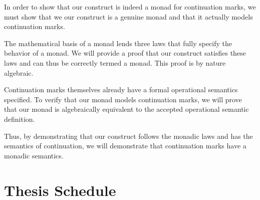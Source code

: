 \documentclass[ms]{byuprop}
\newcounter{definition}
\begin{document}

In order to show that our construct is indeed a monad for continuation marks, we must show
that we our construct is a genuine monad and that it actually models continuation marks.

The mathematical basis of a monad lends three laws that fully specify the behavior of a 
monad. We will provide a proof that our construct satisfies these laws and can thus be 
correctly termed a monad. This proof is by nature algebraic.

Continuation marks themselves already have a formal operational semantics specified. To 
verify that our monad models continuation marks, we will prove that our monad is 
algebraically equivalent to the accepted operational semantic definition.

Thus, by demonstrating that our construct follows the monadic laws and has the semantics
of continuation, we will demonstrate that continuation marks have a monadic semantics.







\section{Thesis Schedule}
\end{document}
